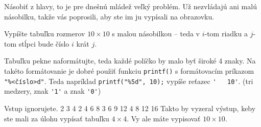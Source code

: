 




Násobiť z hlavy, to je pre dnešnú mládež veľký problém.
Už nezvládajú ani malú násobilku, takže vás poprosili, aby ste im
ju vypísali na obrazovku.


Vypíšte tabuľku rozmerov $10 \times 10$ s malou násobilkou -- teda v $i$-tom riadku
a $j$-tom stĺpci bude číslo $i$ krát $j$.

Tabuľku pekne naformátujte, teda každé políčko by malo byť široké 4 znaky.
Na takéto formátovanie je dobré použiť funkciu \verb!printf()! s formátovacím 
príkazom \verb!"%<číslo>d"!. Teda napríklad \verb!printf("%5d", 10);! vypíše reťazec \verb!'   10'!.
(tri medzery, znak \verb!'1'! a znak \verb!'0'!)


\vstup
Vstup ignorujete.
   2   3   4
   2   4   6   8
   3   6   9  12
   4   8  12  16
\komentar
Takto by vyzeral výstup, keby ste mali za úlohu vypísať tabuľku $4\times 4$.
Vy ale máte vypisovať $10\times 10$.
\koniec


